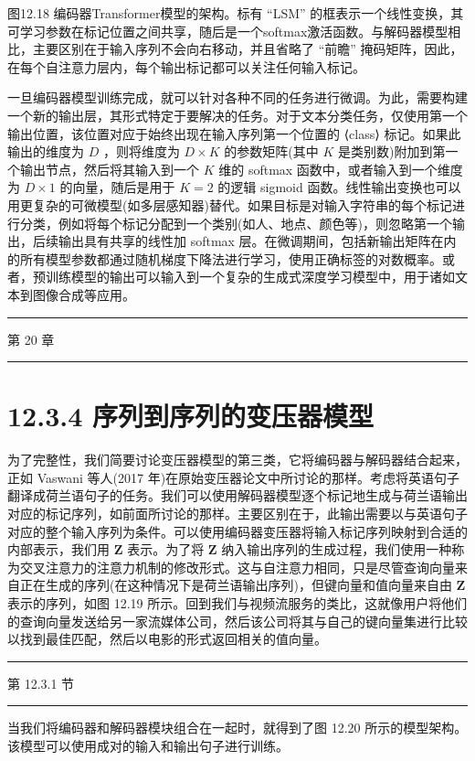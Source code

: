 \documentclass[10pt]{article}
\newcommand{\HRule}{\begin{center}\rule{0.9\linewidth}{0.2mm}\end{center}}
\begin{document}
图12.18 编码器Transformer模型的架构。标有 “LSM” 的框表示一个线性变换，其可学习参数在标记位置之间共享，随后是一个softmax激活函数。与解码器模型相比，主要区别在于输入序列不会向右移动，并且省略了 “前瞻” 掩码矩阵，因此，在每个自注意力层内，每个输出标记都可以关注任何输入标记。

一旦编码器模型训练完成，就可以针对各种不同的任务进行微调。为此，需要构建一个新的输出层，其形式特定于要解决的任务。对于文本分类任务，仅使用第一个输出位置，该位置对应于始终出现在输入序列第一个位置的 ⟨class⟩ 标记。如果此输出的维度为 \(D\) ，则将维度为 \(D \times  K\) 的参数矩阵(其中 \(K\) 是类别数)附加到第一个输出节点，然后将其输入到一个 \(K\) 维的 softmax 函数中，或者输入到一个维度为 \(D \times  1\) 的向量，随后是用于 \(K = 2\) 的逻辑 sigmoid 函数。线性输出变换也可以用更复杂的可微模型(如多层感知器)替代。如果目标是对输入字符串的每个标记进行分类，例如将每个标记分配到一个类别(如人、地点、颜色等)，则忽略第一个输出，后续输出具有共享的线性加 softmax 层。在微调期间，包括新输出矩阵在内的所有模型参数都通过随机梯度下降法进行学习，使用正确标签的对数概率。或者，预训练模型的输出可以输入到一个复杂的生成式深度学习模型中，用于诸如文本到图像合成等应用。

\HRule

第 20 章

\HRule

\section*{12.3.4 序列到序列的变压器模型}

为了完整性，我们简要讨论变压器模型的第三类，它将编码器与解码器结合起来，正如 Vaswani 等人(2017 年)在原始变压器论文中所讨论的那样。考虑将英语句子翻译成荷兰语句子的任务。我们可以使用解码器模型逐个标记地生成与荷兰语输出对应的标记序列，如前面所讨论的那样。主要区别在于，此输出需要以与英语句子对应的整个输入序列为条件。可以使用编码器变压器将输入标记序列映射到合适的内部表示，我们用 \(\mathbf{Z}\) 表示。为了将 \(\mathbf{Z}\) 纳入输出序列的生成过程，我们使用一种称为交叉注意力的注意力机制的修改形式。这与自注意力相同，只是尽管查询向量来自正在生成的序列(在这种情况下是荷兰语输出序列)，但键向量和值向量来自由 \(\mathbf{Z}\) 表示的序列，如图 12.19 所示。回到我们与视频流服务的类比，这就像用户将他们的查询向量发送给另一家流媒体公司，然后该公司将其与自己的键向量集进行比较以找到最佳匹配，然后以电影的形式返回相关的值向量。

\HRule

第 12.3.1 节

\HRule

当我们将编码器和解码器模块组合在一起时，就得到了图 12.20 所示的模型架构。该模型可以使用成对的输入和输出句子进行训练。
\end{document}
